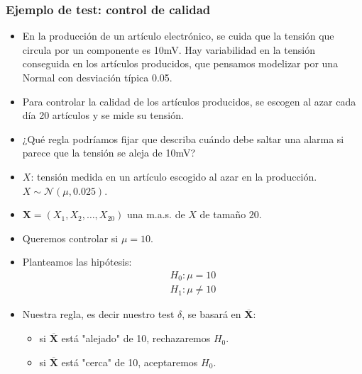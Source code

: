 \subsubsection*{Ejemplo de test: control de calidad}
\begin{tcolorbox}[colback=blue!5!white, colframe=blue!75!black, title=\textbf{Contexto}]
\begin{itemize}[label=\textbullet]
    \item En la producción de un artículo electrónico, se cuida que la tensión que circula por un componente es 10mV. Hay variabilidad en la tensión conseguida en los artículos producidos, que pensamos modelizar por una Normal con desviación típica 0.05.
    \item Para controlar la calidad de los artículos producidos, se escogen al azar cada día 20 artículos y se mide su tensión.
    \item ¿Qué regla podríamos fijar que describa cuándo debe saltar una alarma si parece que la tensión se aleja de 10mV?
\end{itemize}
\end{tcolorbox}
\begin{tcolorbox}[colback=blue!5!white, colframe=blue!75!black, title=\textbf{Traducimos el contexto}]
\begin{itemize}[label=\textbullet]
    \item $X$: tensión medida en un artículo escogido al azar en la producción.  $X\sim \mathcal{N}(\mu,0.025)$.
    \item $\mathbf{X}=(X_1,X_2,\dots,X_{20})$ una m.a.s. de $X$ de tamaño $20$.
    \item Queremos controlar si  $\mu=10$.
\end{itemize}
\end{tcolorbox}
\begin{itemize}[label=\textbullet]
    \item Planteamos las hipótesis: \[
    \begin{array}{l}
        H_0:\mu=10\\
        H_1:\mu\neq 10
    \end{array}
    \]
\item Nuestra regla, es decir nuestro test $\delta$, se basará en  $\mathbf{\overline{X}}$:
    \begin{itemize}[label=\textrightarrow]
        \item si $\mathbf{\overline{X}}$ está "alejado" de 10, rechazaremos $H_0$.
        \item si $\mathbf{\overline{X}}$ está "cerca" de 10, aceptaremos $H_0$.
    \end{itemize}
\end{itemize}
